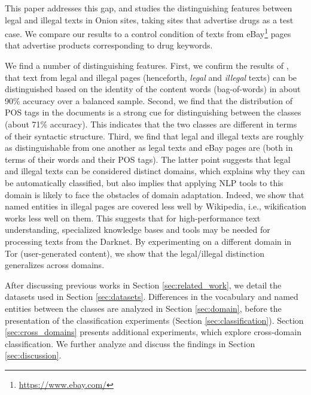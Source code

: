 \documentclass[11pt,a4paper,table]{article}
\newcommand{\es}[1]{\footnote{\color{purple}ES: #1}}
\begin{document}
  
  This paper addresses this gap, and studies the distinguishing features between legal and illegal texts in Onion sites,
  taking sites that advertise drugs as a test case. We compare our results to a control condition of texts 
  from eBay\footnote{\url{https://www.ebay.com/}} pages that 
	advertise products corresponding to drug keywords.
 
  We find a number of distinguishing features. First, we confirm the results of \citet{Avarikioti18}, 
	that text from legal and illegal pages (henceforth, {\it legal} and {\it illegal} texts) can be distinguished based on the identity of the content words (bag-of-words) 
  in about 90\% accuracy over a balanced sample. Second, we find that the distribution of POS tags in the documents is a strong cue for 
	distinguishing between the classes (about 71\% accuracy). This indicates that the two classes are different in 
	terms of their syntactic structure. Third, we find that legal and illegal texts are roughly as distinguishable from one another as legal 
	texts and eBay pages are (both in terms of their words and their POS tags). 
	The latter point suggests that legal and illegal texts can be considered distinct domains, which explains why they can be 
	automatically classified, but also implies that applying NLP tools to this domain is likely to face the obstacles of domain adaptation.  
  Indeed, we show that named entities in illegal pages are covered less well by Wikipedia, i.e., wikification works less well on them.
  This suggests that for high-performance text understanding, specialized knowledge bases and tools may be needed for processing texts from the Darknet.
  By experimenting on a different domain in Tor (user-generated content), we show that the legal/illegal distinction generalizes across domains.

  After discussing previous works in Section \ref{sec:related_work}, we detail the datasets used in Section \ref{sec:datasets}. Differences in the vocabulary and named entities between the classes are analyzed in Section \ref{sec:domain}, before the presentation of the classification experiments (Section \ref{sec:classification}). Section \ref{sec:cross_domains} presents additional experiments, which explore cross-domain classification. We further analyze and discuss the findings in Section \ref{sec:discussion}.
  
\end{document}
